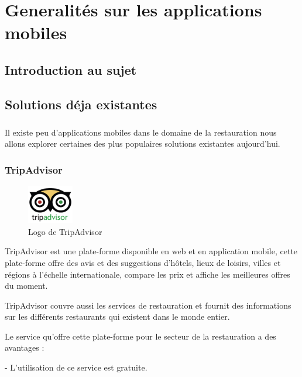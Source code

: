 % 

\chapter{Generalités sur les applications mobiles}
\section{Introduction au sujet}
\newpage
\section{Solutions déja existantes}
\paragraph*{}
Il existe peu d'applications mobiles dans le domaine de la restauration nous allons explorer certaines des plus populaires solutions existantes aujourd’hui.


\subsection{TripAdvisor}
\begin{figure}
    \vspace{-15pt}
    \includegraphics[width=2cm]{images/Chapitre1/tripadvisor.png}
    \vspace{-20pt}
    \caption{{\footnotesize Logo de TripAdvisor}}
\end{figure}

TripAdvisor est une plate-forme disponible en web et en application mobile, cette plate-forme offre des avis et des suggestions d'hôtels, lieux de loisirs, villes et régions à l'échelle internationale, compare les prix et affiche les meilleures offres du moment.

TripAdvisor couvre aussi les services de restauration et fournit des informations sur les différents restaurants qui existent dans le monde entier. \bigskip

Le service qu'offre cette plate-forme pour le secteur de la restauration a des avantages : \bigskip

	\tab- L'utilisation de ce service est gratuite.\medskip

